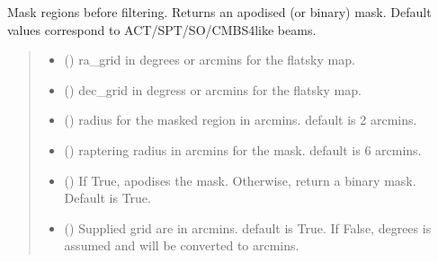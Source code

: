 \documentclass[letterpaper,10pt,english]{sphinxmanual}
\begin{document}
\begin{fulllineitems}
\label{\detokenize{inpaint:inpaint.masking_for_filtering}}
\pysigstartsignatures
{}
\pysigstopsignatures
\sphinxAtStartPar
Mask regions before filtering. Returns an apodised (or binary) mask.
Default values correspond to ACT/SPT/SO/CMB\sphinxhyphen{}S4\sphinxhyphen{}like beams.
\begin{quote}\begin{description}
\begin{itemize}
\item {} 
\sphinxAtStartPar
{} () \textendash{} ra\_grid in degrees or arcmins for the flatsky map.

\item {} 
\sphinxAtStartPar
{} () \textendash{} dec\_grid in degress or arcmins for the flatsky map.

\item {} 
\sphinxAtStartPar
{} () \textendash{} radius for the masked region in arcmins.
default is 2 arcmins.

\item {} 
\sphinxAtStartPar
{} () \textendash{} raptering radius in arcmins for the mask.
default is 6 arcmins.

\item {} 
\sphinxAtStartPar
{} () \textendash{} If True, apodises the mask. Otherwise, return a binary mask.
Default is True.

\item {} 
\sphinxAtStartPar
{} () \textendash{} Supplied grid are in arcmins.
default is True.
If False, degrees is assumed and will be converted to arcmins.


\end{itemize}
\end{description}
\end{quote}
\end{fulllineitems}
\end{document}

